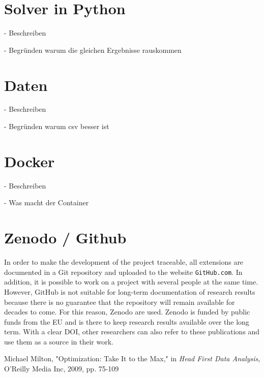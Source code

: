 \documentclass{article}
\begin{document}
\begin{multicols}{2}

\section{Solver in Python}
- Beschreiben

- Begründen warum die gleichen Ergebnisse rauskommen

\section{Daten}
- Beschreiben 

- Begründen warum csv besser ist 

\section{Docker}
- Beschreiben

- Was macht der Container

\section{Zenodo / Github}
In order to make the development of the project traceable, all extensions are documented in a Git repository and uploaded to the website \texttt{GitHub.com}. In addition, it is possible to work on a project with several people at the same time. However, GitHub is not suitable for long-term documentation of research results because there is no guarantee that the repository will remain available for decades to come. For this reason, Zenodo are used.
Zenodo is funded by public funds from the EU and is there to keep research results available over the long term. With a clear DOI, other researchers can also refer to these publications and use them as a source in their work.


\begin{thebibliography}{2}
  Michael Milton, "Optimization: Take It to the Max," in  \textit{Head First Data Analysis}, O'Reilly Media Inc, 2009, pp. 75-109

\end{thebibliography}


\end{multicols}
\end{document}
